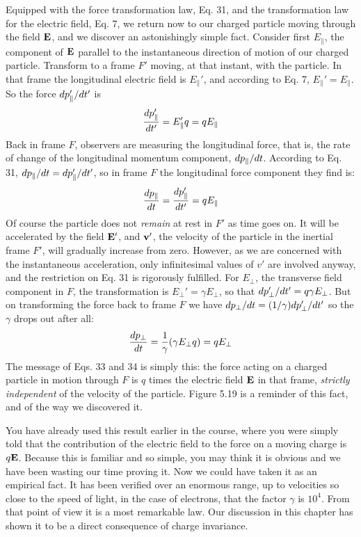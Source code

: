 Equipped with the force transformation law, Eq. 31, and the transformation
law for the electric field, Eq. 7, we return now to our
charged particle moving through the field $\mathbf{E}$, and we discover an
astonishingly simple fact. Consider first $E_\parallel$, the component of $\mathbf{E}$
parallel to the instantaneous direction of motion of our charged
particle. Transform to a frame $F'$ moving, at that instant, with the
particle. In that frame the longitudinal electric field is $E_\parallel'$, and
according to Eq. 7, $E_\parallel'=E_\parallel$. So the force $d p_\parallel'/d t'$ is
\begin{equation}
  \frac{d p_\parallel'}{d t'} = E_\parallel' q = q E_\parallel
\end{equation}
Back in frame $F$, observers are measuring the longitudinal force, that
is, the rate of change of the longitudinal momentum component,
$d p_\parallel/d t$. According to Eq. 31, 
$d p_\parallel/d t=d p_\parallel'/d t'$, so in frame $F$ the
longitudinal force component they find is:
\begin{equation}
  \frac{d p_\parallel}{d t} = \frac{d p_\parallel'}{d t'} = q E_\parallel
\end{equation}
Of course the particle does not \emph{remain} at rest in $F'$ as time goes on.
It will be accelerated by the field $\mathbf{E}'$, and $\mathbf{v'}$, the velocity of the particle
in the inertial frame $F'$, will gradually increase from zero. However,
as we are concerned with the instantaneous acceleration, only
infinitesimal values of $v'$ are involved anyway, and the restriction
on Eq. 31 is rigorously fulfilled. For $E_\perp$, the transverse field component
in $F$, the transformation is $E_\perp'=\gamma E_\perp$, so that 
$d p_\perp'/d t' = q\gamma E_\perp$. But on transforming the force back 
to frame $F$ we have
$d p_\perp/d t = (1/\gamma) d p_\perp'/d t'$ so the $\gamma$ drops out after all:
\begin{equation}
  \frac{d p_\perp}{d t} = \frac{1}{\gamma}(\gamma E_\perp q) = qE_\perp
\end{equation}
The message of Eqs. 33 and 34 is simply this: the force acting on a
charged particle in motion through $F$ is $q$ times the electric field $\mathbf{E}$ in
that frame, \emph{strictly independent} of the velocity of the particle.
Figure 5.19 is a reminder of this fact, and of the way we discovered it.

You have already used this result earlier in the course, where you
were simply told that the contribution of the electric field to the force
on a moving charge is $q\mathbf{E}$. Because this is familiar and so simple, you
may think it is obvious and we have been wasting our time proving it.
Now we could have taken it as an empirical fact. It has been verified
over an enormous range, up to velocities so close to the speed of light,
in the case of electrons, that the factor $\gamma$ is $10^4$. From that point of
view it is a most remarkable law. Our discussion in this chapter has
shown it to be a direct consequence of charge invariance.

